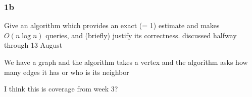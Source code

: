 \subsubsection*{1b}
Give an algorithm which provides an exact (\alpha = 1) estimate and makes $O(n \log n)$ queries, and (briefly) justify its correctness.
discussed halfway through 13 August 

We have a graph and the algorithm takes a vertex and the algorithm asks how many edges it has or who is its neighbor

I think this is coverage from week 3?
